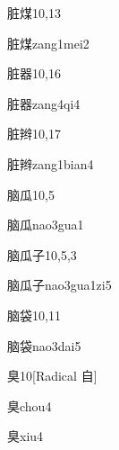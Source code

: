 \begin{entry}{脏煤}{10,13}
  \begin{phonetics}{脏煤}{zang1mei2}
  \end{phonetics}
\end{entry}

\begin{entry}{脏器}{10,16}
  \begin{phonetics}{脏器}{zang4qi4}
  \end{phonetics}
\end{entry}

\begin{entry}{脏辫}{10,17}
  \begin{phonetics}{脏辫}{zang1bian4}
  \end{phonetics}
\end{entry}

\begin{entry}{脑瓜}{10,5}
  \begin{phonetics}{脑瓜}{nao3gua1}
  \end{phonetics}
\end{entry}

\begin{entry}{脑瓜子}{10,5,3}
  \begin{phonetics}{脑瓜子}{nao3gua1zi5}
  \end{phonetics}
\end{entry}

\begin{entry}{脑袋}{10,11}
  \begin{phonetics}{脑袋}{nao3dai5}
  \end{phonetics}
\end{entry}

\begin{entry}{臭}{10}[Radical ⾃]
  \begin{phonetics}{臭}{chou4}
  \end{phonetics}
  \begin{phonetics}{臭}{xiu4}
  \end{phonetics}
\end{entry}

